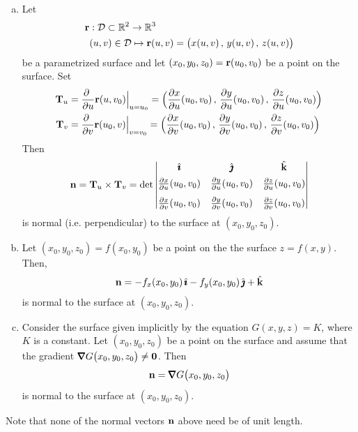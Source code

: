 \begin{theorem}\label{thm:normalVectors}

\begin{enumerate}[(a)]

\item
Let
\begin{align*}
\mathbf{r}&: \mathcal{D}\subset\mathbb{R}^2 \rightarrow \mathbb{R}^3 \\
   &(u,v) \in\mathcal{D} \mapsto \mathbf{r}(u,v) =\big(x(u,v)\,,\,y(u,v)\,,\,z(u,v)\big)
\end{align*}
be a parametrized surface and let $(x_0,y_0,z_0)=\mathbf{r}(u_0,v_0)$ 
be a point on the surface. Set
\begin{align*}
\mathbf{T}_u &= \frac{\partial\ }{\partial u}\mathbf{r}(u,v_0)\Big|_{u=u_0}
=\Big(\frac{\partial x}{\partial u}(u_0,v_0)\,,\,
      \frac{\partial y}{\partial u}(u_0,v_0)\,,\,
      \frac{\partial z}{\partial u}(u_0,v_0)\Big) \\
\mathbf{T}_v &= \frac{\partial\ }{\partial v}\mathbf{r}(u_0,v)\Big|_{v=v_0}
=\Big(\frac{\partial x}{\partial v}(u_0,v_0)\,,\,
      \frac{\partial y}{\partial v}(u_0,v_0)\,,\,
      \frac{\partial z}{\partial v}(u_0,v_0)\Big)
\end{align*}
Then
\begin{align*}
\mathbf{n} = \mathbf{T}_u\times\mathbf{T}_v
=\det\left|\begin{matrix}
            \hat{\pmb{\imath}} &  \hat{\pmb{\jmath}} & \hat{\mathbf{k}} \\[0.05in]
            \frac{\partial x}{\partial u}(u_0,v_0) &
                     \frac{\partial y}{\partial u}(u_0,v_0) &
                     \frac{\partial z}{\partial u}(u_0,v_0) \\[0.1in]
           \frac{\partial x}{\partial v}(u_0,v_0) &
                     \frac{\partial y}{\partial v}(u_0,v_0) &
                     \frac{\partial z}{\partial v}(u_0,v_0)
           \end{matrix}\right|
\end{align*}
is normal (i.e. perpendicular) to the surface at $(x_0,y_0,z_0)$.


\item
Let $(x_0,y_0,z_0)=f(x_0,y_0)$ be a point on the 
the surface $z=f(x,y)$. Then, 
\begin{align*}
\mathbf{n} =-f_x(x_0,y_0)\,\hat{\pmb{\imath}} - f_y(x_0,y_0)\,\hat{\pmb{\jmath}} + \hat{\mathbf{k}}
\end{align*}
is normal to the surface at $(x_0,y_0,z_0)$.

\item 
Consider the surface given implicitly by the equation $G(x,y,z) = K$, 
where $K$ is a constant. Let $(x_0,y_0,z_0)$ be a point on the surface and assume that the gradient $\vnabla G\big(x_0,y_0,z_0\big)\ne \vZero$. Then
\begin{align*}
\vn= \vnabla G\big(x_0,y_0,z_0\big)
\end{align*}
is normal to the surface at $(x_0,y_0,z_0)$.

\end{enumerate}

Note that none of the normal vectors $\mathbf{n}$ above need be of unit length.
\end{theorem}
